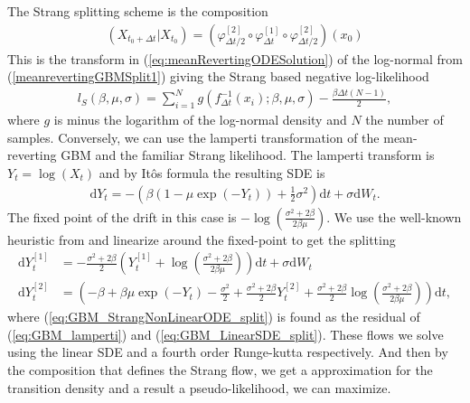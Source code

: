 The Strang splitting scheme is the composition
\begin{align}
    \left(X_{t_0 + \Delta t} | X_{t_0}\right) = \left(\varphi_{\Delta t / 2}^{[2]}\circ \varphi_{\Delta t}^{[1]} \circ \varphi_{\Delta t / 2}^{[2]}\right)(x_0)
\end{align}
This is the transform in (\ref{eq:meanRevertingODESolution}) of the log-normal from (\ref{meanrevertingGBMSplit1}) giving the Strang based negative log-likelihood
\begin{align}
    l_S(\beta, \mu, \sigma) = \sum_{i = 1}^{N} g(f_{\Delta t}^{-1}(x_i); \beta,\mu, \sigma) - \frac{\beta\Delta t(N - 1)}{2},
\end{align}
where $g$ is minus the logarithm of the log-normal density and $N$ the number of samples.
Conversely, we can use the lamperti transformation of the mean-reverting GBM and the familiar Strang likelihood. The lamperti transform is $Y_t = \log(X_t)$ and by Itôs formula the resulting SDE is
\begin{align}
    \mathrm{d}Y_t = -\left(\beta\left(1 - \mu\exp(-Y_t)\right) + \frac{1}{2}\sigma^2\right)\mathrm{d}t + \sigma \mathrm{d}W_t. \label{eq:GBM_lamperti}
\end{align}
The fixed point of the drift in this case is $-\log\left(\frac{\sigma^2 + 2\beta}{2\beta\mu}\right)$. We use the well-known heuristic from \cite{SplittingSchemes} and linearize around the fixed-point to get the splitting
\begin{align}
    \mathrm{d}Y_t^{[1]} &= - \frac{\sigma^2 + 2\beta}{2}\left(Y_t^{[1]} + \log\left(\frac{\sigma^2 + 2\beta}{2\beta \mu}\right)\right)\mathrm{d}t + \sigma \mathrm{d}W_t \label{eq:GBM_LinearSDE_split}\\
    \mathrm{d}Y_t^{[2]} &= \left(-\beta + \beta\mu\exp(-Y_t) - \frac{\sigma^2}{2} + \frac{\sigma^2+2\beta}{2}Y_t^{[2]} + \frac{\sigma^2+2\beta}{2}\log\left(\frac{\sigma^2+2\beta}{2\beta\mu}\right)\right)\mathrm{d}t, \label{eq:GBM_StrangNonLinearODE_split}
\end{align}
where (\ref{eq:GBM_StrangNonLinearODE_split}) is found as the residual of (\ref{eq:GBM_lamperti}) and (\ref{eq:GBM_LinearSDE_split}).
These flows we solve using the linear SDE and a fourth order Runge-kutta respectively. And then by the composition that defines the Strang flow, we get a approximation for the transition density and a result a pseudo-likelihood, we can maximize.

